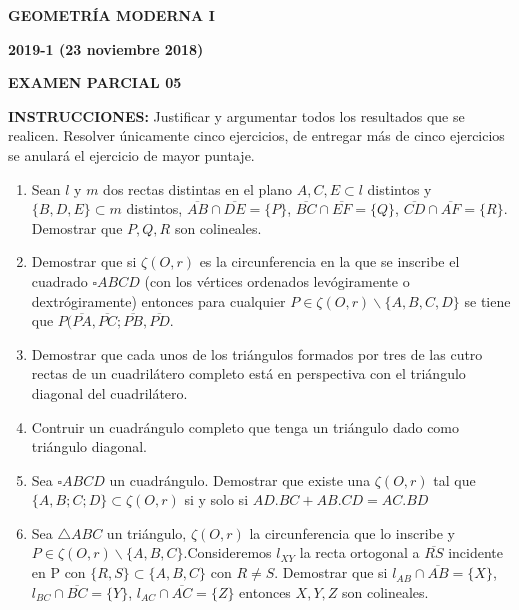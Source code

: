 \documentclass[12pt]{report}
\begin{document}
\begin{center}
\textbf{\LARGE {GEOMETRÍA MODERNA I}}
\end{center}

\begin{center}
\textbf{{\large 2019-1 (23 noviembre 2018)}}
\end{center}

\begin{center}
\textbf{{\large EXAMEN PARCIAL 05}}
\end{center}

\vspace{1cm}

{\bf INSTRUCCIONES:} Justificar y argumentar todos los resultados que se realicen. Resolver únicamente cinco ejercicios, de entregar más de cinco ejercicios se anulará el ejercicio de mayor puntaje.

\vspace{1cm}

\begin{enumerate}

\item Sean $l$ y $m$ dos rectas distintas en el plano ${A,C,E}\subset l$ distintos y $\{B,D,E\}\subset m$ distintos, $\overline{AB}\cap\overline{DE}=\{P\}$, $\overline{BC}\cap\overline{EF}=\{Q\}$, $\overline{CD}\cap\overline{AF}=\{R\}$. Demostrar que $P,Q,R$ son colineales.

\item Demostrar que si $\zeta(O,r)$ es la circunferencia en la que se inscribe el cuadrado $\square ABCD$ (con los vértices ordenados levógiramente o dextrógiramente) entonces para cualquier $P\in \zeta(O,r)\backslash\{A,B,C,D\}$ se tiene que $P(\overline{PA},\overline{PC};\overline{PB},\overline{PD}$.

\item Demostrar que cada unos de los triángulos formados por tres de las cutro rectas de un cuadrilátero completo está en perspectiva con el triángulo diagonal del cuadrilátero.

\item Contruir un cuadrángulo completo que tenga un triángulo dado como triángulo diagonal.

\item Sea $\square ABCD$ un cuadrángulo.
Demostrar que  existe una $\zeta(O,r)$ tal que $\{A,B;C;D\}\subset \zeta(O,r)$ si y solo si $AD.BC + AB.CD = AC.BD$

\item Sea $\triangle ABC$ un triángulo, $\zeta(O,r)$ la circunferencia que lo inscribe y $P\in \zeta(O,r)\backslash \{A,B,C\}$.Consideremos $l_{XY}$ la recta ortogonal a $\overline{RS}$ incidente en P con $\{R,S\}\subset \{A,B,C\}$ con $R\neq S$. Demostrar que si  $l_{AB}\cap \overline{AB}=\{X\}$, $l_{BC}\cap \overline{BC}=\{Y\}$, $l_{AC}\cap \overline{AC}=\{Z\}$ entonces $X,Y,Z$ son colineales.



\end{enumerate}
\end{document}
